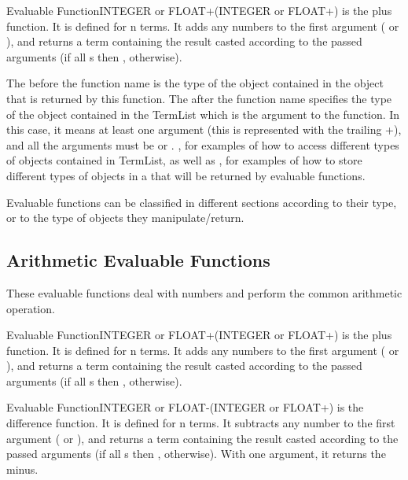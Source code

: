 \begin{typeefa}{Evaluable Function}{INTEGER or FLOAT}{+}{({INTEGER or FLOAT}+)}
is the plus function. It is defined for n terms. It adds any numbers to the
first argument ( or ), and returns a term containing
the result casted according to the passed arguments (if all s
then ,  otherwise).
\end{typeefa}

The  before the function name \code{+} is the type
of the object contained in the  object that is returned by
this \code{+} function.  The  after the function
name specifies the type of the object contained in the TermList which is
the argument to the  function. In this case, it means at least
one argument (this is represented with the trailing +), and all the arguments
must be  or  .  , for examples of how to access different types of objects
contained in TermList, as well as , for examples of how to store different types of objects in a
 that will be returned by evaluable functions.

Evaluable functions can be classified in different sections according to their
type, or to the type of objects they manipulate/return.



\subsection{Arithmetic Evaluable Functions}

These evaluable functions deal with numbers and perform the common arithmetic
operation.

\begin{typeefa}{Evaluable Function}{INTEGER or FLOAT}{+}{({INTEGER or FLOAT}+)}
is the plus function. It is defined for n terms. It adds any numbers to the
first argument ( or ), and returns a term containing
the result casted according to the passed arguments (if all s
then ,  otherwise).
\end{typeefa}

\begin{typeefa}{Evaluable Function}{INTEGER or FLOAT}{-}{({INTEGER or FLOAT}+)}
is the difference function. It is defined for n terms. It subtracts any
number to the first argument ( or ), and returns a term containing
the result casted according to the passed arguments (if all s then ,
 otherwise). With one argument, it returns the minus.
\end{typeefa}

